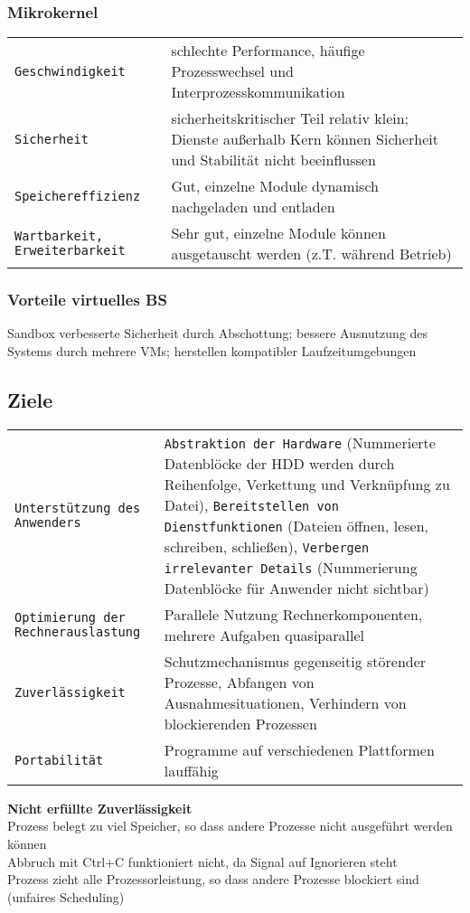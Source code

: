 \subsubsection{Mikrokernel}
\begin{tabular}{@{}p{\the\MyLen}%
		@{}p{\linewidth-\the\MyLen}@{}}
	\texttt{Geschwindigkeit} & schlechte Performance, häufige Prozesswechsel und Interprozesskommunikation\\
	\texttt{Sicherheit} & sicherheitskritischer Teil relativ klein; Dienste außerhalb Kern können Sicherheit und Stabilität nicht beeinflussen\\
	\texttt{Speichereffizienz} & Gut, einzelne Module dynamisch nachgeladen und entladen\\
	\texttt{Wartbarkeit, Erweiterbarkeit} & Sehr gut, einzelne Module können ausgetauscht werden (z.T. während Betrieb)\\
\end{tabular}

\subsubsection{Vorteile virtuelles BS}
Sandbox verbesserte Sicherheit durch Abschottung; bessere Ausnutzung des Systems durch mehrere VMs; herstellen kompatibler Laufzeitumgebungen\\

\subsection{Ziele}
\begin{tabular}{@{}p{\the\MyLen}%
		@{}p{\linewidth-\the\MyLen}@{}}
	\texttt{Unterstützung des Anwenders} & \texttt{Abstraktion der Hardware} (Nummerierte Datenblöcke der HDD werden durch Reihenfolge, Verkettung und Verknüpfung zu Datei), \texttt{Bereitstellen von Dienstfunktionen} (Dateien öffnen, lesen, schreiben, schließen), \texttt{Verbergen irrelevanter Details} (Nummerierung Datenblöcke für Anwender nicht sichtbar)\\
	\texttt{Optimierung der Rechnerauslastung} & Parallele Nutzung Rechnerkomponenten, mehrere Aufgaben quasiparallel\\
	\texttt{Zuverlässigkeit} & Schutzmechanismus gegenseitig störender Prozesse, Abfangen von Ausnahmesituationen, Verhindern von blockierenden Prozessen\\
	\texttt{Portabilität} & Programme auf verschiedenen Plattformen lauffähig\\
\end{tabular}
\textbf{Nicht erfüllte Zuverlässigkeit}\\
Prozess belegt zu viel Speicher, so dass andere Prozesse nicht ausgeführt werden können\\
Abbruch mit Ctrl+C funktioniert nicht, da Signal auf Ignorieren steht\\
Prozess zieht alle Prozessorleistung, so dass andere Prozesse blockiert sind (unfaires Scheduling)

